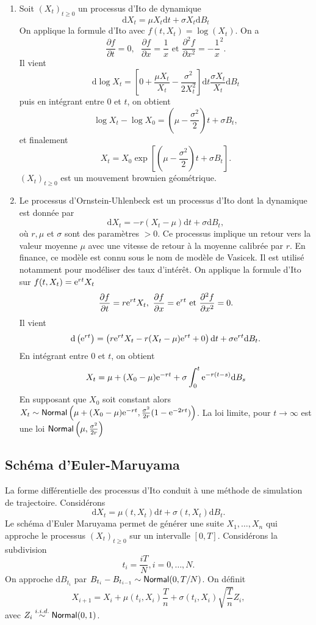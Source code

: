 \begin{ex}
\begin{enumerate}
	\item Soit $(X_t)_{t\geq 0}$ un processus d'Ito de dynamique 
	$$
	\text{d}X_t = \mu X_t\text{d}t+\sigma X_t\text{d}B_t
	$$
	On applique la formule d'Ito avec $f(t, X_t) = \log(X_t)$. On a 
	$$
	\frac{\partial f}{\partial t} = 0,\text{ }\frac{\partial f}{\partial x} = \frac 1x\text{ et }\frac{\partial^2 f}{\partial x^2} = -\frac{1}{x}^2.
	$$
	Il vient 
	$$
	\text{d}\log X_t = \left[0+\frac{\mu X_t}{X_t} - \frac{\sigma^2}{2X_t^2}\right]\text{d}t \frac{\sigma X_t}{X_t}\text{d}B_t
	$$
	puis en intégrant entre $0$ et $t$, on obtient 
	$$
	\log X_t - \log X_0 = \left(\mu - \frac{\sigma^2}{2}\right)t + \sigma B_t,
	$$
	et finalement 
	$$
	X_t = X_0\exp\left[\left(\mu - \frac{\sigma^2}{2}\right)t + \sigma B_t\right].
	$$
	$(X_t)_{t\geq 0}$ est un mouvement brownien géométrique.
	\item Le processus d'Ornstein-Uhlenbeck est un processus d'Ito dont la dynamique est donnée par 
	$$
	\text{d}X_t = -r(X_t - \mu)\text{d}t + \sigma\text{d}B_t,
	$$
	où $r,\mu$ et $\sigma$ sont des paramètres $>0$. Ce processus implique un retour vers la valeur moyenne $\mu$ avec une vitesse de retour à la moyenne calibrée par $r$. En finance, ce modèle est connu sous le nom de modèle de Vasicek. Il est utilisé notamment pour modéliser des taux d'intérêt. On applique la formule d'Ito sur $f(t, X_t) = \mathrm{e}^{rt}X_t$
	$$
	\frac{\partial f}{\partial t} = r\mathrm{e}^{rt}X_t,\text{ }\frac{\partial f}{\partial x} = \mathrm{e}^{rt}\text{ et }\frac{\partial^2 f}{\partial x^2} = 0.
	$$
	Il vient 
	$$
	\text{d}\left(\mathrm{e}^{rt}\right) = \left(r\mathrm{e}^{rt}X_t - r(X_t - \mu)\mathrm{e}^{rt}+0\right)\text{d}t + \sigma\mathrm{e}^{rt}\text{d}B_t.
	$$
	En intégrant entre $0$ et $t$, on obtient 
	$$
	X_t = \mu + (X_0 - \mu)\mathrm{e}^{-rt} + \sigma \int_0^t\mathrm{e}^{-r(t-s)}\text{d}B_s
	$$
	En supposant que $X_0$ soit constant alors $X_t \sim\mathsf{Normal}\left(\mu + (X_0 - \mu)\mathrm{e}^{-rt}, \frac{\sigma^2}{2r}(1-\mathrm{e}^{-2rt})\right)$. La loi limite, pour $t\rightarrow \infty$ est une loi $\mathsf{Normal}\left(\mu, \frac{\sigma^2}{2r}\right)$
\end{enumerate}
\end{ex}
\subsection{Schéma d'Euler-Maruyama}
La forme différentielle des processus d'Ito conduit à une méthode de simulation de trajectoire. Considérons 
$$
\text{d}X_t = \mu(t,X_t)\text{d}t+ \sigma(t, X_t)\text{d}B_t.
$$
Le schéma d'Euler Maruyama permet de générer une suite $X_1,\ldots, X_n$ qui approche le processus $(X_t)_{t\geq 0}$ sur un intervalle $[0, T]$. Considérons la subdivision 
$$
t_i = \frac{iT}{N}, i = 0,\ldots, N.
$$
On approche $\text{d}B_{t_{i}}$ par $B_{t_{i}} - B_{t_{i-1}}\sim\mathsf{Normal}(0, T/N)$. On définit 
$$
X_{i+1} = X_i + \mu(t_i, X_i)\frac{T}{n} + \sigma(t_i, X_i)\sqrt{\frac{T}{n}}Z_i,
$$
avec $Z_i\overset{i.i.d.}{\sim} \mathsf{Normal}(0,1)$.
